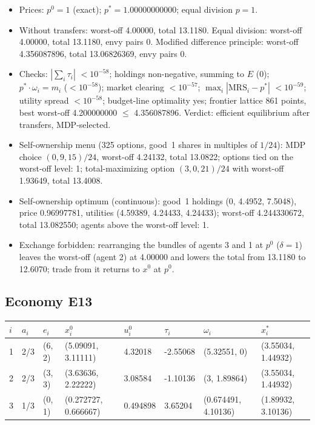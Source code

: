\begin{itemize}[leftmargin=1.2em,itemsep=0pt,topsep=2pt]\footnotesize
\item Prices: $p^0 = 1$ (exact); $p^* = 1.00000000000$; equal division $p = 1$.
\item Without transfers: worst-off 4.00000, total 13.1180. Equal division: worst-off 4.00000, total 13.1180, envy pairs 0. Modified difference principle: worst-off 4.356087896, total 13.06826369, envy pairs 0.
\item Checks: $|\sum_i\tau_i|$ $<10^{-58}$; holdings non-negative, summing to $E$ (0); $p^*\cdot\omega_i = m_i$ ($<10^{-58}$); market clearing $<10^{-57}$; $\max_i|\mathrm{MRS}_i - p^*|$ $<10^{-59}$; utility spread $<10^{-58}$; budget-line optimality yes; frontier lattice 861 points, best worst-off 4.200000000 $\leq$ 4.356087896. Verdict: efficient equilibrium after transfers, MDP-selected.
\item Self-ownership menu (325 options, good~1 shares in multiples of $1/24$): MDP choice $(0, 9, 15)/24$, worst-off 4.24132, total 13.0822; options tied on the worst-off level: 1; total-maximizing option $(3, 0, 21)/24$ with worst-off 1.93649, total 13.4008.
\item Self-ownership optimum (continuous): good~1 holdings (0, 4.4952, 7.5048), price 0.96997781, utilities (4.59389, 4.24433, 4.24433); worst-off 4.244330672, total 13.082550; agents above the worst-off level: 1.
\item Exchange forbidden: rearranging the bundles of agents 3 and 1 at $p^0$ ($\delta = 1$) leaves the worst-off (agent 2) at 4.00000 and lowers the total from 13.1180 to 12.6070; trade from it returns to $x^0$ at $p^0$.
\end{itemize}

\subsection*{Economy E13}
\label{ec:E13}
{\scriptsize\setlength{\tabcolsep}{3pt}
\begin{tabular}{@{}llllllll@{}}
\toprule
$i$ & $a_i$ & $e_i$ & $x^0_i$ & $u^0_i$ & $\tau_i$ & $\omega_i$ & $x^*_i$ \\
\midrule
1 & 2/3 & (6, 2) & (5.09091, 3.11111) & 4.32018 & -2.55068 & (5.32551, 0) & (3.55034, 1.44932) \\
2 & 2/3 & (3, 3) & (3.63636, 2.22222) & 3.08584 & -1.10136 & (3, 1.89864) & (3.55034, 1.44932) \\
3 & 1/3 & (0, 1) & (0.272727, 0.666667) & 0.494898 & 3.65204 & (0.674491, 4.10136) & (1.89932, 3.10136) \\
\bottomrule\end{tabular}}


